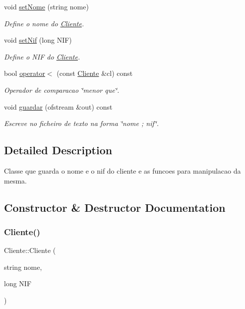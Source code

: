 \begin{DoxyCompactItemize}
void \hyperlink{class_cliente_a383af20fa7ace06d4f04fe26e82e0ca2}{set\+Nome} (string nome)
\begin{DoxyCompactList}\small\item\em Define o nome do \hyperlink{class_cliente}{Cliente}. \end{DoxyCompactList}\item 
void \hyperlink{class_cliente_a8d729975d853d8f4a0123906655b5e73}{set\+Nif} (long N\+IF)
\begin{DoxyCompactList}\small\item\em Define o N\+IF do \hyperlink{class_cliente}{Cliente}. \end{DoxyCompactList}\item 
bool \hyperlink{class_cliente_a093309873c9b1514786650e03a50247e}{operator$<$} (const \hyperlink{class_cliente}{Cliente} \&cl) const
\begin{DoxyCompactList}\small\item\em Operador de comparacao \char`\"{}menor que\char`\"{}. \end{DoxyCompactList}\item 
void \hyperlink{class_cliente_ad1f4557a02cedb762de957cb18e97dd5}{guardar} (ofstream \&out) const
\begin{DoxyCompactList}\small\item\em Escreve no ficheiro de texto na forma \char`\"{}nome ; nif\char`\"{}. \end{DoxyCompactList}\end{DoxyCompactItemize}


\subsection{Detailed Description}
Classe que guarda o nome e o nif do cliente e as funcoes para manipulacao da mesma. 

\subsection{Constructor \& Destructor Documentation}
\hypertarget{class_cliente_a14240898329d14688bb7e2e2709db710}{}\label{class_cliente_a14240898329d14688bb7e2e2709db710} 
\subsubsection{\texorpdfstring{Cliente()}{Cliente()}\hspace{0.1cm}{\footnotesize\ttfamily [1/3]}}
{\footnotesize\ttfamily Cliente\+::\+Cliente (\begin{DoxyParamCaption}\item[{string}]{nome,  }\item[{long}]{N\+IF }\end{DoxyParamCaption})}



